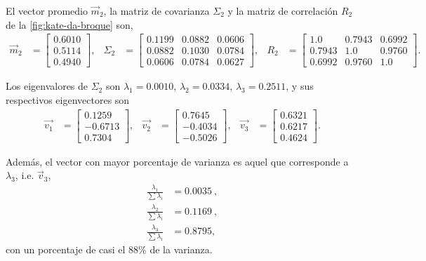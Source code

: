 El vector promedio $\vec{m}_2$, la matriz de covarianza $\Sigma_2$ y la matriz de correlación $R_2$ de la \cref{fig:kate-da-broque} son,
\begin{align*}
    \vec{m}_2 & =
    \begin{bmatrix}
        0.6010 \\
        0.5114 \\
        0.4940
    \end{bmatrix}, &
    \Sigma_2 & =
    \begin{bmatrix}
        0.1199 & 0.0882 & 0.0606 \\
        0.0882 & 0.1030 & 0.0784 \\
        0.0606 & 0.0784 & 0.0627
    \end{bmatrix}, &
    R_2 & = 
    \begin{bmatrix}
        1.0    & 0.7943 & 0.6992 \\
        0.7943 & 1.0    & 0.9760 \\
        0.6992 & 0.9760 & 1.0
    \end{bmatrix}.
\end{align*}

Los eigenvalores de $\Sigma_2$ son $\lambda_1 = 0.0010$, $\lambda_2 = 0.0334$, $\lambda_3 = 0.2511$, y sus respectivos eigenvectores son
\begin{align*}
    \vec{v_1} & =
    \begin{bmatrix}
        0.1259 \\
        -0.6713 \\
        0.7304
    \end{bmatrix}, &
    \vec{v_2} & = 
    \begin{bmatrix}
        0.7645 \\
        -0.4034 \\
        -0.5026
    \end{bmatrix}, &
    \vec{v_3} & =
    \begin{bmatrix}
        0.6321 \\
        0.6217 \\
        0.4624
    \end{bmatrix}.
\end{align*}

Además, el vector con mayor porcentaje de varianza es aquel que corresponde a $\lambda_3$, i.e. $\vec{v}_3$,
\begin{align*}
    \frac{\lambda_1}{\sum \lambda_i} & = 0.0035\ , \\
    \frac{\lambda_2}{\sum \lambda_i} & = 0.1169\ , \\
    \frac{\lambda_3}{\sum \lambda_i} & = 0.8795 ,
\end{align*}
con un porcentaje de casi el $88\%$ de la varianza.


